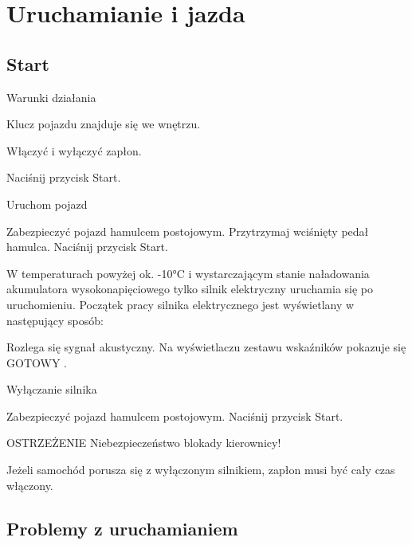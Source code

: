 

\section{Uruchamianie i jazda}

\subsection{Start}

Warunki działania
\begin{itemizeTick}
	\itemTick Klucz pojazdu znajduje się we wnętrzu.
\end{itemizeTick}

Włączyć i wyłączyć zapłon.
\begin{itemizeArrow}
	\itemArrow Naciśnij przycisk Start.
\end{itemizeArrow}

Uruchom pojazd
\begin{itemizeArrow}
	\itemArrow Zabezpieczyć pojazd hamulcem postojowym.
	\itemArrow Przytrzymaj wciśnięty pedał hamulca.
	\itemArrow Naciśnij przycisk Start.
\end{itemizeArrow}

W temperaturach powyżej ok. -10°C i wystarczającym stanie naładowania akumulatora wysokonapięciowego tylko silnik elektryczny uruchamia się po
uruchomieniu.
Początek pracy silnika elektrycznego jest wyświetlany w następujący sposób:
\begin{itemizeTriangle}
	\itemTriangle Rozlega się sygnał akustyczny.
	\itemTriangle Na wyświetlaczu zestawu wskaźników pokazuje się GOTOWY .
\end{itemizeTriangle}

Wyłączanie silnika
\begin{itemizeArrow}
	\itemArrow Zabezpieczyć pojazd hamulcem postojowym.
	\itemArrow Naciśnij przycisk Start.
\end{itemizeArrow}

OSTRZEŻENIE
Niebezpieczeństwo blokady kierownicy!
\begin{itemizeTriangle}
	\itemTriangle Jeżeli samochód porusza się z wyłączonym silnikiem, zapłon musi być cały czas włączony.
\end{itemizeTriangle}

\subsection{Problemy z uruchamianiem}

